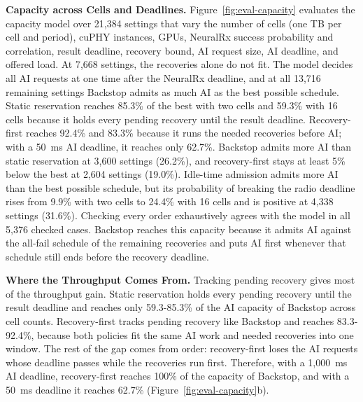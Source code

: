 \documentclass[acmsmall,screen,review,anonymous]{acmart}
\newcommand{\sys}{Backstop\xspace}
\newcommand{\NRx}{NeuralRx\xspace}
\begin{document}
\noindent\textbf{Capacity across Cells and Deadlines.}
Figure~\ref{fig:eval-capacity} evaluates the capacity model over 21,384 settings that vary the number of
cells (one TB per cell and period), cuPHY instances, GPUs, \NRx success probability and correlation,
result deadline, recovery bound, AI request size, AI deadline, and offered load. At 7,668 settings, the
recoveries alone do not fit. The model decides all AI requests at one time after the \NRx deadline, and
at all 13,716 remaining settings \sys admits as much AI as the best possible schedule. Static reservation
reaches 85.3\% of the best with two cells and 59.3\% with 16 cells because it holds every pending
recovery until the result deadline. Recovery-first reaches 92.4\% and 83.3\% because it runs the needed
recoveries before AI; with a 50~ms AI deadline, it reaches only 62.7\%. \sys admits more AI than static
reservation at 3,600 settings (26.2\%), and recovery-first stays at least 5\% below the best at 2,604
settings (19.0\%). Idle-time admission admits more AI than the best possible schedule, but its
probability of breaking the radio deadline rises from 9.9\% with two cells to 24.4\% with 16 cells and
is positive at 4,338 settings (31.6\%). Checking every order exhaustively agrees with the model in all
5,376 checked cases. \sys reaches this capacity because it admits AI against the all-fail schedule of the
remaining recoveries and puts AI first whenever that schedule still ends before the recovery deadline.

\noindent\textbf{Where the Throughput Comes From.}
Tracking pending recovery gives most of the throughput gain. Static reservation holds every pending
recovery until the result deadline and reaches only 59.3-85.3\% of the AI capacity of \sys across cell
counts. Recovery-first tracks pending recovery like \sys and reaches 83.3-92.4\%, because both policies
fit the same AI work and needed recoveries into one window. The rest of the gap comes from order:
recovery-first loses the AI requests whose deadline passes while the recoveries run first. Therefore,
with a 1,000~ms AI deadline, recovery-first reaches 100\% of the capacity of \sys, and with a 50~ms
deadline it reaches 62.7\% (Figure~\ref{fig:eval-capacity}b).
\end{document}
